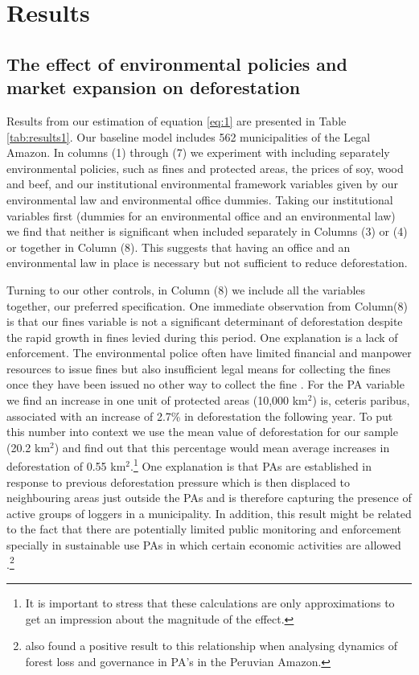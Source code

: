
\section{Results}
\label{S:4}

\subsection{The effect of environmental policies and market expansion on deforestation}

Results from our estimation of equation \ref{eq:1} are presented in Table \ref{tab:results1}. Our baseline model includes 562 municipalities of the Legal Amazon. In columns (1) through (7) we experiment with including separately environmental policies, such as fines and protected areas, the prices of soy, wood and beef, and our institutional environmental framework variables given by our environmental law and environmental office dummies. Taking our institutional variables first (dummies for an environmental office and an environmental law) we find that neither is significant when included separately in Columns (3) or (4) or together in Column (8). This suggests that having an office and an environmental law in place is necessary but not sufficient to reduce deforestation.

Turning to our other controls, in Column (8) we include all the variables together, our preferred specification.  One immediate observation from Column(8) is that our fines variable is not a significant determinant of deforestation despite the rapid growth in fines levied during this period. One explanation is a lack of enforcement. The environmental police often have limited financial and manpower resources to issue fines but also insufficient legal means for collecting the fines once they have been issued no other way to collect the fine \citep{araujo_barreto_baima_gomes_2017}.  For the PA variable we find an increase in one unit of protected areas (10,000 km$^{2}$) is, ceteris paribus, associated with an increase of 2.7\% in deforestation the following year. To put this number into context we use the mean value of deforestation for our sample (20.2 km$^{2}$) and find out that this percentage would mean average increases in deforestation of 0.55 km$^{2}$.\footnote{It is important to stress that these calculations are only approximations to get an impression about the magnitude of the effect.} One explanation is that PAs are established in response to previous deforestation pressure which is then displaced to neighbouring areas just outside the PAs and is therefore capturing the presence of active groups of loggers in a municipality. In addition, this result might be related to the fact that there are potentially limited public monitoring and enforcement specially in sustainable use PAs in which certain economic activities are allowed \citep{RICO_2017}.\footnote{\citet{RICO_2017} also found a positive result to this relationship when analysing dynamics of forest loss and governance in PA's in the Peruvian Amazon.}

